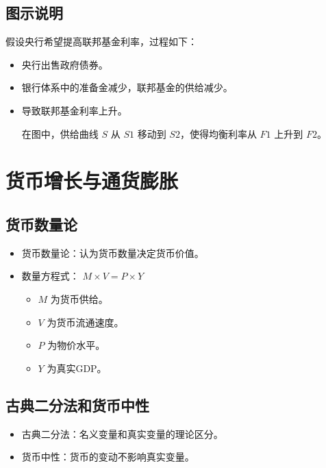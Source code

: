 \documentclass[12pt, a4paper]{article}
\begin{document}
\subsection*{图示说明}
假设央行希望提高联邦基金利率，过程如下：
\begin{itemize}
    \item 央行出售政府债券。
    \item 银行体系中的准备金减少，联邦基金的供给减少。
    \item 导致联邦基金利率上升。


在图中，供给曲线 \( S \) 从 \( S1 \) 移动到 \( S2 \)，使得均衡利率从 \( F1 \) 上升到 \( F2 \)。
\end{itemize}


\section{货币增长与通货膨胀}

\subsection{货币数量论}
\begin{itemize}
    \item 货币数量论：认为货币数量决定货币价值。
    \item 数量方程式： \( M \times V = P \times Y \)
    \begin{itemize}
        \item \( M \) 为货币供给。
        \item \( V \) 为货币流通速度。
        \item \( P \) 为物价水平。
        \item \( Y \) 为真实GDP。
    \end{itemize}
\end{itemize}

\subsection{古典二分法和货币中性}
\begin{itemize}
    \item 古典二分法：名义变量和真实变量的理论区分。
    \item 货币中性：货币的变动不影响真实变量。
\end{itemize}
\end{document}
